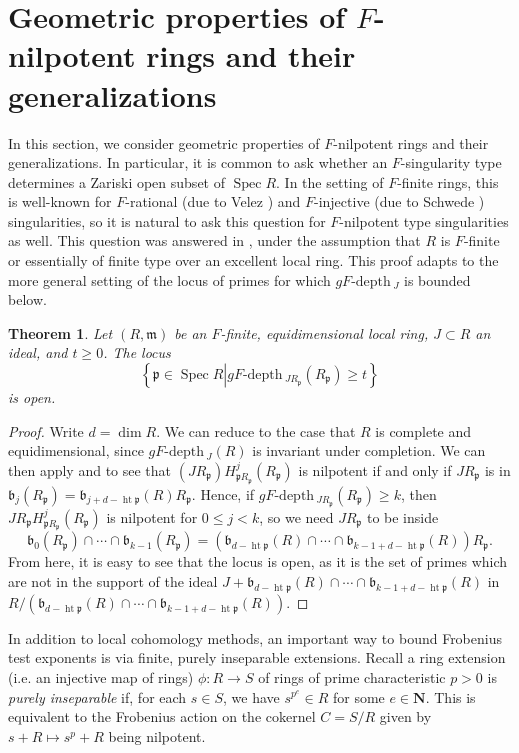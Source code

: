 \documentclass{amsproc}
\newtheorem{theorem}{Theorem}[section]
\theoremstyle{definition}
\theoremstyle{remark}
\numberwithin{equation}{section}
\newcommand{\NN}{\mathbf{N}}
\newcommand{\fm}{\mathfrak{m}}
\newcommand{\fb}{\mathfrak{b}}
\newcommand{\fp}{\mathfrak{p}}
\newcommand{\Spec}{\operatorname{Spec}}
\newcommand{\hgt}{\operatorname{ht}}
\newcommand{\gfdp}{gF\text{-depth}\,}
\begin{document}
\section{Geometric properties of \texorpdfstring{$F$}{F}-nilpotent rings and their generalizations}


In this section, we consider geometric properties of $F$-nilpotent rings and their generalizations. In particular, it is common to ask whether an $F$-singularity type determines a Zariski open subset of $\Spec R$. In the setting of $F$-finite rings, this is well-known for $F$-rational (due to Velez \cite{Vel95}) and $F$-injective (due to Schwede \cite{Sch09}) singularities, so it is natural to ask this question for $F$-nilpotent type singularities as well. This question was answered in \cite[Thm. 5.2]{KMPS23}, under the assumption that $R$ is $F$-finite or essentially of finite type over an excellent local ring. This proof adapts to the more general setting of the locus of primes for which $\gfdp_J$ is bounded below.

\begin{theorem}\label{thm:gfdpopen}
Let $(R,\fm)$ be an $F$-finite, equidimensional local ring, $J\subset R$ an ideal, and $t \ge 0$. The locus \[ \left\lbrace \fp \in \Spec R \left| \gfdp_{JR_\fp}(R_\fp) \ge t\right.\right\rbrace\] is open.
\end{theorem}
\begin{proof}
Write $d =\dim R$. We can reduce to the case that $R$ is complete and equidimensional, since $\gfdp_J(R)$ is invariant under completion. We can then apply \cite[Lem. 3.9]{CMM23} and  to see that $(JR_\fp)H^j_{\fp R_\fp}(R_\fp)$ is nilpotent if and only if $JR_\fp$ is in $\fb_{j}(R_\fp) = \fb_{j+d-\hgt \fp}(R) R_\fp$. Hence, if $\gfdp_{JR_\fp}(R_\fp)\ge k$, then $JR_\fp H^j_{\fp R_\fp}(R_\fp)$ is nilpotent for $0 \le j < k$, so we need $JR_\fp$ to be inside $$\fb_0(R_\fp) \cap \cdots \cap \fb_{k-1}(R_\fp) = (\fb_{d-\hgt\fp}(R) \cap\cdots \cap \fb_{k-1+d-\hgt\fp}(R))R_\fp.$$ From here, it is easy to see that the locus is open, as it is the set of primes which are not in the support of the ideal $J+\fb_{d-\hgt\fp} (R) \cap \cdots \cap \fb_{k-1+d-\hgt\fp}(R)$ in $R/\left(\fb_{d-\hgt\fp} (R) \cap \cdots \cap \fb_{k-1+d-\hgt\fp}(R)\right)$.
\end{proof}


In addition to local cohomology methods, an important way to bound Frobenius test exponents is via finite, purely inseparable extensions. Recall a ring extension (i.e. an injective map of rings) $\phi : R \rightarrow S$ of rings of prime characteristic $p>0$ is \textit{purely inseparable} if, for each $s \in S$, we have $s^{p^e} \in R$ for some $e \in \NN$. This is equivalent to the Frobenius action on the cokernel $C=S/R$ given by $s+R \mapsto s^p+R$ being nilpotent. 
\end{document}
